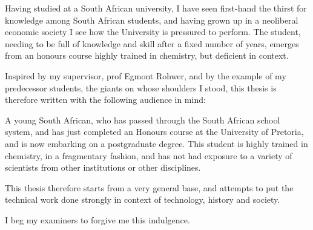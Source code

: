 \documentclass[
11pt, %
english, %
singlespacing, %
headsepline, %
]{MastersDoctoralThesis} %
\begin{document}

\begin{preface}
\addchaptertocentry{\prefacename}

Having studied at a South African university, I have seen first-hand the thirst
for knowledge among South African students, and having grown up in a neoliberal
economic society I see how the University is pressured to perform. The student,
needing to be full of knowledge and skill after a fixed number of years, emerges
from an honours course highly trained in chemistry, but deficient in context.

Inspired by my supervisor, prof Egmont Rohwer, and by the example of my
predecessor students, the giants on whose shoulders I stood, this thesis is
therefore written with the following audience in mind:

A young South African, who has passed through the South African school system,
and has just completed an Honours course at the University of Pretoria, and is
now embarking on a postgraduate degree. This student is highly trained in
chemistry, in a fragmentary fashion, and has not had exposure to a variety of
scientists from other institutions or other disciplines.

This thesis therefore starts from a very general base, and attempts to put the
technical work done strongly in context of technology, history and society.

I beg my examiners to forgive me this indulgence.

\end{preface}
\addchaptertocentry{\prefacename}


\tableofcontents %

\listoffigures %

\listoftables %

\end{document}
